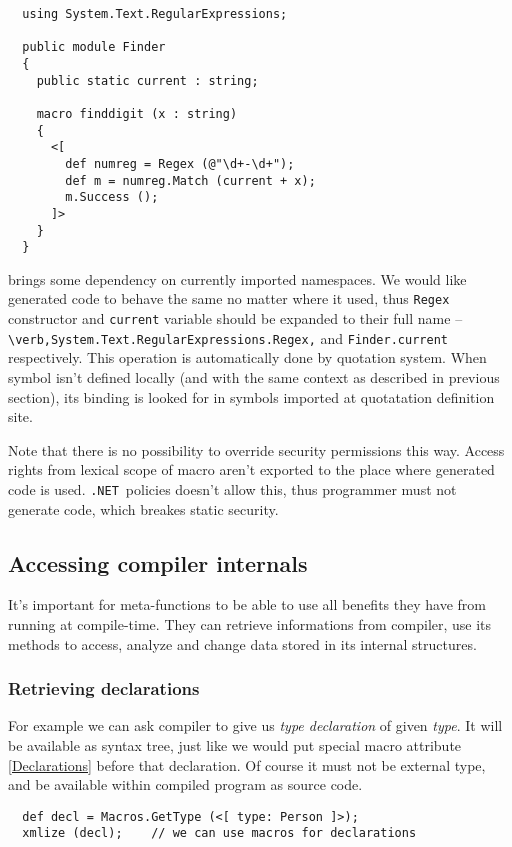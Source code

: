 \documentclass{llncs}
\newcommand{\net}[0]{{\tt .NET}}
\begin{document}
\begin{verbatim}
  using System.Text.RegularExpressions;

  public module Finder 
  {
    public static current : string;

    macro finddigit (x : string)
    {
      <[ 
        def numreg = Regex (@"\d+-\d+");
        def m = numreg.Match (current + x);
        m.Success ();
      ]>
    }
  }
\end{verbatim} %

brings some dependency on currently imported namespaces. We would like
generated code to behave the same no matter where it used, thus 
\verb,Regex, constructor and \verb,current, variable should be expanded to
their full name -- \verb;\verb,System.Text.RegularExpressions.Regex,;
and \verb,Finder.current, respectively. This operation is automatically
done by quotation system. When symbol isn't defined locally (and with the same 
context as described in previous section), its binding is looked for in symbols
imported at quotatation definition site.

Note that there is no possibility to override security permissions this
way. Access rights from lexical scope of macro aren't exported to the place
where generated code is used. \net\ policies doesn't allow this, thus
programmer must not generate code, which breakes static security.

\subsection{Accessing compiler internals}
It's important for meta-functions to be able to use all benefits they have
from running at compile-time. They can retrieve informations from
compiler, use its methods to access, analyze and change data stored
in its internal structures. 

\subsubsection{Retrieving declarations}
For example we can ask compiler to give us \emph{type declaration} of
given \emph{type}. It will be available as syntax tree, just like we
would put special macro attribute \ref{Declarations} before that declaration.
Of course it must not be external type, and be available within compiled 
program as source code.

\begin{verbatim}
  def decl = Macros.GetType (<[ type: Person ]>);
  xmlize (decl);    // we can use macros for declarations
\end{verbatim}
\end{document}
